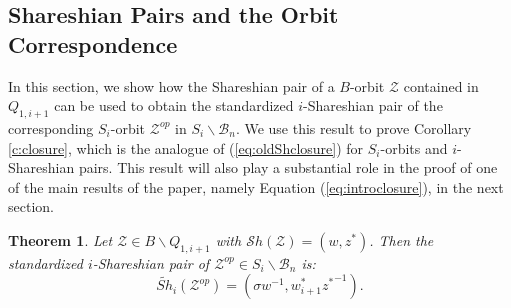 \documentclass[12pt]{amsart}
\numberwithin{equation}{section}
\newtheorem{thm}{Theorem}[section]
\newcommand{\cZ}{{\mathcal Z}}
\newcommand{\B}{\mathcal{B}}
\newcommand{\Sh}{\mathcal{S}h}
\begin{document}
 
 \subsection{Shareshian Pairs and the Orbit Correspondence}
 
  In this section, we show how the Shareshian pair of a $B$-orbit 
 $\cZ$ contained in $Q_{1,i+1}$ can be used to obtain the standardized $i$-Shareshian pair of the corresponding $S_{i}$-orbit ${\cZ}^{op}$ in $S_{i}\backslash\B_{n}$.  We use this result to prove Corollary \ref{c:closure}, which is the analogue of (\ref{eq:oldShclosure}) for $S_{i}$-orbits and $i$-Shareshian pairs.  This result will also play a substantial role in the proof of one of the main results of the paper, namely Equation (\ref{eq:introclosure}), in the next section. 

 
\begin{thm}\label{thm:localShareshian}
Let $\cZ\in B\backslash Q_{1,i+1}$ with $\Sh(\cZ)=(w,z^{*})$.  Then the \emph{standardized $i$-Shareshian }pair of ${\cZ}^{op}\in S_{i}\backslash\B_{n}$ is:
\begin{equation}\label{eq:localSh}
 \widetilde{Sh}_{i}({\cZ}^{op})=(\sigma w^{-1}, w_{i+1}^{*} {z^{*}}^{-1}).
\end{equation}
\end{thm}
\end{document}
